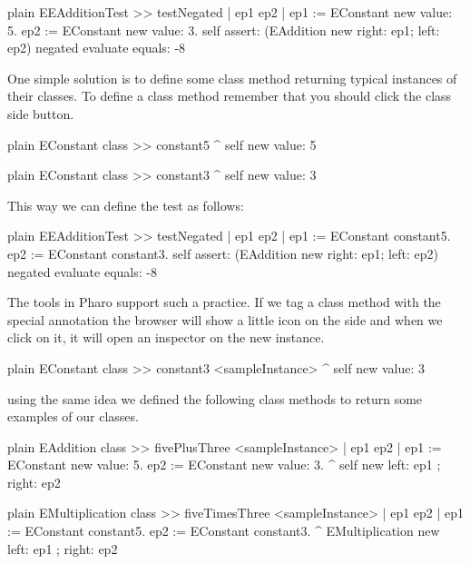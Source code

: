 \documentclass[10pt,twoside,english]{_support/latex/sbabook/sbabook}
\begin{document}
\begin{displaycode}{plain}
EEAdditionTest >> testNegated
	| ep1 ep2 |
	ep1 := EConstant new value: 5.
	ep2 := EConstant new value: 3.
	self assert: (EAddition new right: ep1; left: ep2) negated evaluate equals: -8
\end{displaycode}

One simple solution is to define some class method returning typical instances of their classes. To define a class method remember that you should click the class side button. 

\begin{displaycode}{plain}
EConstant class >> constant5
	^ self new value: 5
\end{displaycode}

\begin{displaycode}{plain}
EConstant class >> constant3
	^ self new value: 3
\end{displaycode}

This way we can define the test as follows:

\begin{displaycode}{plain}
EEAdditionTest >> testNegated
	| ep1 ep2 |
	ep1 := EConstant constant5.
	ep2 := EConstant constant3.
	self assert: (EAddition new right: ep1; left: ep2) negated evaluate equals: -8
\end{displaycode}

The tools in Pharo support such a practice. If we tag a class method with the special annotation  the browser will show a little icon on the side and when we click on it, it will open an inspector on the new instance. 

\begin{displaycode}{plain}
EConstant class >> constant3
	<sampleInstance>
	^ self new value: 3
\end{displaycode}

using the same idea we defined the following class methods to return some examples of our classes.

\begin{displaycode}{plain}
EAddition class >> fivePlusThree
	<sampleInstance>
	| ep1 ep2 |
	ep1 := EConstant new value: 5.
	ep2 := EConstant new value: 3.
	^ self new left: ep1 ; right: ep2 
\end{displaycode}

\begin{displaycode}{plain}
EMultiplication class >> fiveTimesThree
	<sampleInstance>
	| ep1 ep2 |
	ep1 := EConstant constant5.
	ep2 := EConstant constant3.
   ^ EMultiplication new left: ep1 ; right: ep2 
\end{displaycode}
\end{document}

